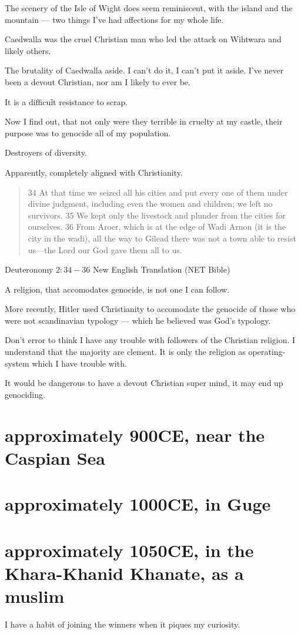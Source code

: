 The scenery of the Isle of Wight does seem reminiscent, with the island and the
mountain --- two things I've had affections for my whole life. 

Caedwalla was the cruel Christian man who led the attack on Wihtwara and likely
others.

The brutality of Caedwalla aside. I can't do it, I can't put it aside. 
I've never been a devout Christian, nor am I likely to ever be. 

It is a difficult resistance to scrap. 

Now I find out, that not only were they terrible in cruelty at my castle,
their purpose was to genocide all of my population.

Destroyers of diversity. 

Apparently, completely aligned with Christianity. 

\blockquote{34 At that time we seized all his cities and put every one of them 
under divine judgment, including even the women and children; we left no 
survivors. 35 We kept only the livestock and plunder from the cities for 
ourselves. 36 From Aroer, which is at the edge of Wadi Arnon (it is the city in
 the wadi), all the way to Gilead there was not a town able to resist us—the 
Lord our God gave them all to us.}{Deuteronomy $2:34-36$ New English Translation
(NET Bible)}
 
A religion, that accomodates genocide, is not one I can follow.

More recently, Hitler used Christianity\cite{christianhitler} to accomodate 
the genocide of those who were not scandinavian typology --- which he believed
was God's typology.

Don't error to think I have any trouble with followers of the Christian
religion. I understand that the majority are clement. It is only the religion as
operating-system which I have trouble with.

It would be dangerous to have a devout Christian super mind,
it may end up genociding.
\chapter{approximately 900CE, near the Caspian Sea}
\chapter{approximately 1000CE, in Guge}
\chapter{approximately 1050CE, in the Khara-Khanid Khanate, as a muslim}
\label{reincarnation:muslim}
I have a habit of joining the winners when it piques my curiosity. 

